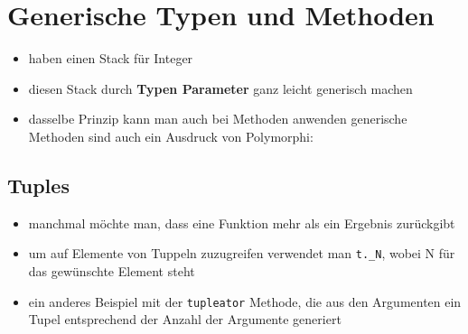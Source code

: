 \section{Generische Typen und Methoden}
\begin{itemize}
  \item haben einen Stack für Integer
  
  
  
  \item diesen Stack durch \textbf{Typen Parameter} ganz leicht generisch machen
  
  
  
  \item dasselbe Prinzip kann man auch bei Methoden anwenden \und generische
  Methoden sind auch ein Ausdruck von Polymorphi:
  
  
\end{itemize}


\subsection{Tuples}
\begin{itemize}
  \item manchmal möchte man, dass eine Funktion mehr als ein Ergebnis
  zurückgibt
  
  

  \item um auf Elemente von Tuppeln zuzugreifen verwendet man
  \texttt{t.\_N}, wobei N für das gewünschte Element steht
  \item ein anderes Beispiel mit der \texttt{tupleator} Methode, die aus den
  Argumenten ein Tupel entsprechend der Anzahl der Argumente generiert
  
  

\end{itemize}
\pagebreak


